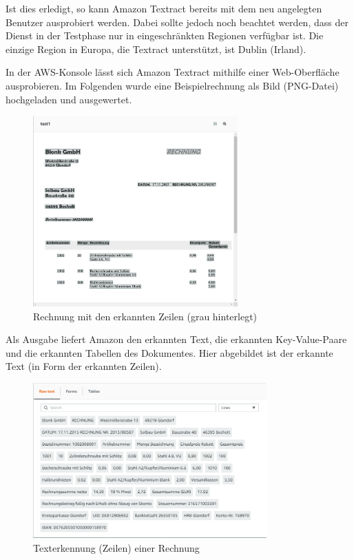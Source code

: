 \documentclass{whswinvcbook}
\begin{document}
Ist dies erledigt, so kann Amazon Textract bereits mit dem neu angelegten Benutzer ausprobiert werden. Dabei sollte jedoch noch beachtet werden, dass der Dienst in der Testphase nur in eingeschränkten Regionen verfügbar ist. Die einzige Region in Europa, die Textract unterstützt, ist Dublin (Irland).

In der AWS-Konsole lässt sich Amazon Textract mithilfe einer Web-Oberfläche ausprobieren. Im Folgenden wurde eine Beispielrechnung als Bild (PNG-Datei) hochgeladen und ausgewertet.
\begin{figure}[H]
    \centering
    \includegraphics[width=0.7\textwidth]{img/textract_aws_doc.png}
    \caption{Rechnung mit den erkannten Zeilen (grau hinterlegt)}
    \label{fig-textract-aws-doc}
\end{figure}
Als Ausgabe liefert Amazon den erkannten Text, die erkannten Key-Value-Paare und die erkannten Tabellen des Dokumentes. Hier abgebildet ist der erkannte Text (in Form der erkannten Zeilen).
\begin{figure}[H]
    \centering
    \includegraphics[width=0.8\textwidth]{img/textract_aws_ocr.png}
    \caption{Texterkennung (Zeilen) einer Rechnung}
    \label{fig-textract-aws-ocr}
\end{figure}
\end{document}
